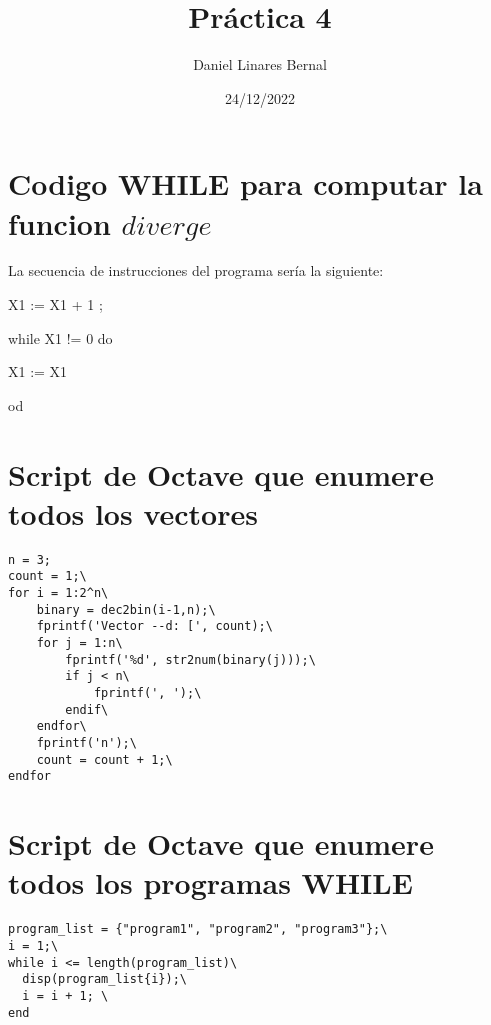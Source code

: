 \documentclass[11pt]{article}
\title{\textbf{Práctica 4}}
\author{Daniel Linares Bernal}
\date{24/12/2022}
\begin{document}
\maketitle

\section{Codigo WHILE para computar la funcion $diverge$}

La secuencia de instrucciones del programa sería la siguiente:

X1 := X1 + 1 ;

while X1 != 0 do

X1 := X1

od
\section{Script de Octave que enumere todos los vectores}
\begin{verbatim}
n = 3;
count = 1;\
for i = 1:2^n\
  	binary = dec2bin(i-1,n);\
  	fprintf('Vector --d: [', count);\
  	for j = 1:n\
    	fprintf('%d', str2num(binary(j)));\
    	if j < n\
    		fprintf(', ');\
    	endif\
  	endfor\
  	fprintf('n');\
  	count = count + 1;\
endfor
\end{verbatim}
\section{Script de Octave que enumere todos los programas WHILE}
\begin{verbatim}
program_list = {"program1", "program2", "program3"};\
i = 1;\
while i <= length(program_list)\
  disp(program_list{i});\
  i = i + 1; \
end
\end{verbatim}
\end{document}

